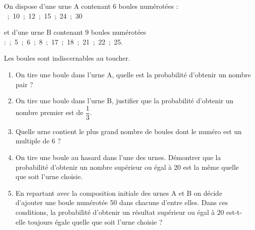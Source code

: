 \documentclass[exercice,a4]{thedocument}%
\begin{document}
%
On dispose d'une urne A contenant 6 boules numérotées : ~;~10~;~12~;~15~;~24~;~30

et d'une urne B contenant 9 boules numérotées :~;~5~;~6~;~8~;~17~;~18~;~21~;~22~;~25.

Les boules sont indiscernables au toucher.

\medskip

	\begin{enumerate}
		\item On tire une boule dans l'urne A, quelle est la probabilité d'obtenir un nombre pair ?
		\item On tire une boule dans l'urne B, justifier que la probabilité d'obtenir un nombre premier est de $\dfrac{1}{3}$.
		\item Quelle urne contient le plus grand nombre de boules dont le numéro est un multiple de 6 ?
		\item On tire une boule au hasard dans l'une des urnes. Démontrer que la probabilité d'obtenir un nombre supérieur ou égal à 20 est la même quelle que soit l'urne choisie.
		\item En repartant avec la composition initiale des urnes A et B on décide d'ajouter une boule numérotée 50 dans chacune d'entre elles. Dans ces conditions, la probabilité d'obtenir un résultat supérieur ou égal à 20 est-t-elle toujours égale quelle que soit l'urne choisie ?
	\end{enumerate}

\bigskip
\showthesource
\end{document}
